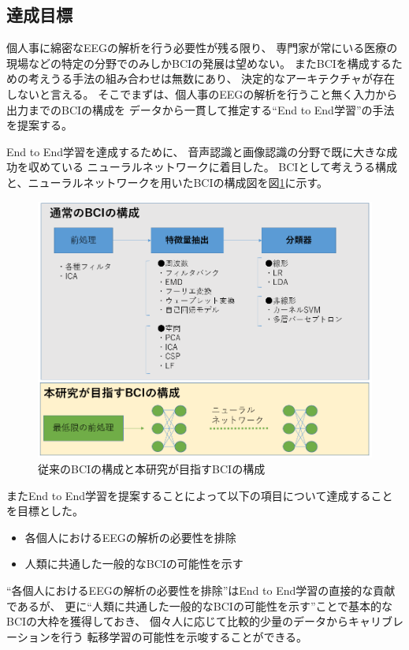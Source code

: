 \subsection{\mc 達成目標}
個人事に綿密なEEGの解析を行う必要性が残る限り、
専門家が常にいる医療の現場などの特定の分野でのみしかBCIの発展は望めない。
またBCIを構成するための考えうる手法の組み合わせは無数にあり、
決定的なアーキテクチャが存在しないと言える。
そこでまずは、個人事のEEGの解析を行うこと無く入力から出力までのBCIの構成を
データから一貫して推定する``End to End学習''の手法を提案する。

End to End学習を達成するために、
音声認識と画像認識の分野で既に大きな成功を収めている
ニューラルネットワークに着目した。
BCIとして考えうる構成と、ニューラルネットワークを用いたBCIの構成図を図\ref{fig:BCIpattern}に示す。
\begin{figure}
    \centering
    \includegraphics[width=12cm]{images/BCIpattern.PNG}
    \caption{従来のBCIの構成と本研究が目指すBCIの構成}
    \label{fig:BCIpattern}
\end{figure}
またEnd to End学習を提案することによって以下の項目について達成することを目標とした。
\begin{itemize}
    \item 各個人におけるEEGの解析の必要性を排除
    \item 人類に共通した一般的なBCIの可能性を示す
\end{itemize}

``各個人におけるEEGの解析の必要性を排除''はEnd to End学習の直接的な貢献であるが、
更に``人類に共通した一般的なBCIの可能性を示す''ことで基本的なBCIの大枠を獲得しておき、
個々人に応じて比較的少量のデータからキャリブレーションを行う
転移学習の可能性を示唆することができる\cite{転移学習}。


